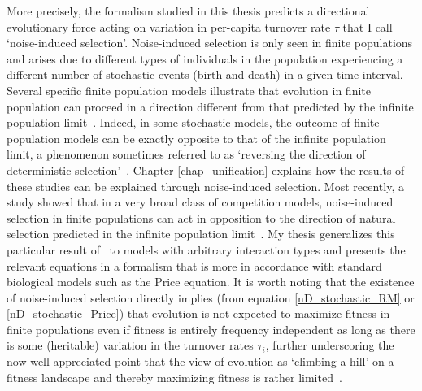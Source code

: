 More precisely, the formalism studied in this thesis predicts a directional evolutionary force acting on variation in per-capita turnover rate $\tau$ that I call `noise-induced selection'. Noise-induced selection is only seen in finite populations and arises due to different types of individuals in the population experiencing a different number of stochastic events (birth and death) in a given time interval. Several specific finite population models illustrate that evolution in finite population can proceed in a direction different from that predicted by the infinite population limit~\citep{parsons_consequences_2010,melbinger_evolutionary_2010, houchmandzadeh_selection_2012, houchmandzadeh_fluctuation_2015,chotibut_evolutionary_2015, behar_fluctuations-induced_2016, constable_demographic_2016,abu_awad_effects_2018,parsons_pathogen_2018,mcleod_social_2019}. Indeed, in some stochastic models, the outcome of finite population models can be exactly opposite to that of the infinite population limit, a phenomenon sometimes referred to as `reversing the direction of deterministic selection'~\citep{constable_demographic_2016,mcleod_social_2019}. Chapter \ref{chap_unification} explains how the  results of these studies can be explained through noise-induced selection. Most recently, a study showed that in a very broad class of competition models, noise-induced selection in finite populations can act in opposition to the direction of natural selection predicted in the infinite population limit~\citep{mazzolini_universality_2022}. My thesis generalizes this particular result of~\cite{mazzolini_universality_2022} to models with arbitrary interaction types and presents the relevant equations in a formalism that is more in accordance with standard biological models such as the Price equation. It is worth noting that the existence of noise-induced selection directly implies (from equation \eqref{nD_stochastic_RM} or \eqref{nD_stochastic_Price}) that evolution is not expected to maximize fitness in finite populations even if fitness is entirely frequency independent as long as there is some (heritable) variation in the turnover rates $\tau_i$, further underscoring the now well-appreciated point that the view of evolution as `climbing a hill' on a fitness landscape and thereby maximizing fitness is rather limited~\citep{grodwohl_theory_2017}.

